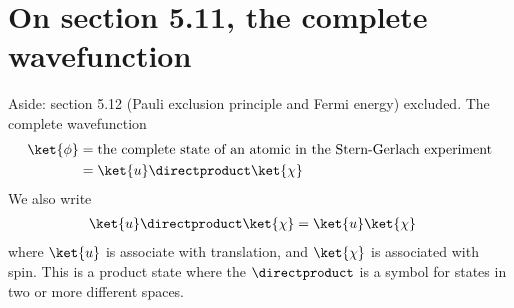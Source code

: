 \section{On section 5.11, the complete wavefunction}
%
Aside: section 5.12 (Pauli exclusion principle and Fermi energy) excluded.
%
The complete wavefunction
%
\begin{equation}\label{eqn:lecture7sternGerlach:260}
\begin{aligned}
\ket{\phi} &= \text{the complete state of an atomic in the Stern-Gerlach experiment} \\
&=
\ket{u} \directproduct \ket{\chi}
\end{aligned}
\end{equation}
%
We also write
%
\begin{equation}\label{eqn:PHY356Foct26:200}
\begin{aligned}
\ket{u} \directproduct \ket{\chi}  &= \ket{u} \ket{\chi}
\end{aligned}
\end{equation}
%
where \(\ket{u}\) is associate with translation, and \(\ket{\chi}\) is associated with spin.  This is a product state where the \(\directproduct\) is a symbol for states in two or more different spaces.

